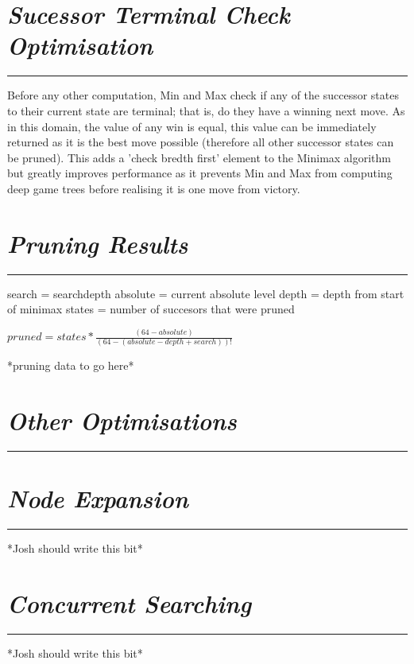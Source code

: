 \documentclass[10pt]{report}
\begin{document}
\begin{multicols}{2}
\section*{\emph{\textmd{Sucessor Terminal Check Optimisation}}}
\hrule
\vspace{0.4cm}

Before any other computation, Min and Max check if any of the successor states to their current state are terminal; that is, do they have a winning next move. As in this domain, the value of any win is equal, this value can be immediately returned as it is the best move possible (therefore all other successor states can be pruned). This adds a 'check bredth first' element to the Minimax algorithm but greatly improves performance as it prevents Min and Max from computing deep game trees before realising it is one move from victory.

\section*{\emph{\textmd{Pruning Results}}}
\hrule
\vspace{0.4cm}

search = searchdepth
absolute = current absolute level
depth = depth from start of minimax
states = number of succesors that were pruned

$pruned = states * \frac{(64 - absolute)}{(64 - (absolute - depth + search))!}$

*pruning data to go here*

\section*{\emph{{Other Optimisations}}}
\hrule
\vspace{0.4cm}

\section*{\emph{\textmd{Node Expansion}}}
\hrule
\vspace{0.4cm}

*Josh should write this bit*

\section*{\emph{\textmd{Concurrent Searching}}}
\hrule
\vspace{0.4cm}

*Josh should write this bit*


\end{multicols}
\end{document}
